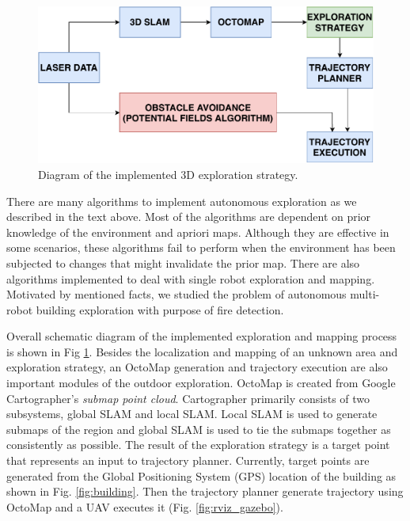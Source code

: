 \begin{figure}[t!]
	\centering
	\includegraphics[width=1.0\columnwidth]{./pictures/3D_strategy.pdf}	
	\caption{Diagram of the implemented 3D exploration strategy.}
	\label{fig:3D_strategy}
\end{figure}


There are many algorithms to implement autonomous exploration as we described in the text above. Most of the algorithms are dependent on prior knowledge of the environment and apriori maps. Although they are effective in some scenarios, these algorithms fail to perform when the environment has been subjected to changes that might invalidate the prior map. There are also algorithms implemented to deal with single robot exploration and mapping. Motivated by mentioned facts, we studied the problem of autonomous multi-robot building exploration with purpose of fire detection.

Overall schematic diagram of the implemented exploration and mapping process is shown in Fig \ref{fig:3D_strategy}. Besides the localization and mapping of an unknown area and exploration strategy, an OctoMap generation and trajectory execution are also important modules of the outdoor exploration. OctoMap is created from Google Cartographer's \textit{submap point cloud}. Cartographer primarily consists of two subsystems, global SLAM and local SLAM. Local SLAM is used to generate submaps of the region and global SLAM is used to tie the submaps together as consistently as possible. The result of the exploration strategy is a target point that represents an input to trajectory planner. Currently, target points are generated from the Global Positioning System (GPS) location of the building as shown in Fig. \ref{fig:building}. Then the trajectory planner generate trajectory using OctoMap and a UAV executes it (Fig. \ref{fig:rviz_gazebo}).


